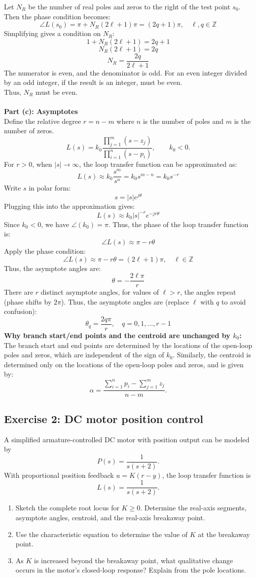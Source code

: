 \documentclass[11pt]{article}
\begin{document}
Let $N_R$ be the number of real poles and zeros to the right of the test point $s_0$. Then the phase condition becomes:
\[\angle L(s_0) = \pi + N_R(2\ell +1)\pi = (2q+1)\pi,\quad \ell,q\in\mathbb{Z}\]
Simplifying gives a condition on $N_R$:
\[1 + N_R(2\ell +1) = 2q+1\]
\[N_R(2\ell +1) = 2q\]
\[N_R = \frac{2 q}{2\ell +1} \]
The numerator is even, and the denominator is odd. For an even integer divided by an odd integer, if the result is an integer, must be even. $\boxed{\text{Thus, $N_R$ must be even.}}$\\\\
\textbf{Part (c): Asymptotes}\\
Define the relative degree $r = n - m$ where $n$ is the number of poles and $m$ is the number of zeros.
\[
L(s)=k_0\frac{\displaystyle\prod_{j=1}^{m}(s-z_j)}{\displaystyle\prod_{i=1}^{n}(s-p_i)}, \qquad k_0<0.
\]
For $r>0$, when $|s| \to \infty$, the loop transfer function can be approximated as:
\[L(s) \approx k_0 \frac{s^m}{s^n} = k_0 s^{m-n} = k_0 s^{-r}\]
Write $s$ in polar form:
\[s = |s| e^{j\theta}\]
Plugging this into the approximation gives:
\[L(s) \approx k_0 |s|^{-r} e^{-j r \theta}\]
Since $k_0<0$, we have $\angle(k_0) = \pi$. Thus, the phase of the loop transfer function is:
\[\angle L(s) \approx \pi - r \theta\]
Apply the phase condition:
\[\angle L(s) \approx \pi - r \theta = (2\ell+1)\pi,\quad \ell\in\mathbb{Z}\]
Thus, the asymptote angles are:
\[\theta = - \frac{2\ell\pi}{r}\]
There are $r$ distinct asymptote angles, for values of $\ell > r$, the angles repeat (phase shifts by $2\pi$). Thus, the asymptote angles are (replace $\ell$ with $q$ to avoid confusion):
\[\boxed{\theta_q  = \frac{2q\pi}{r}, \quad q = 0, 1, \ldots, r-1}\]
\textbf{Why branch start/end points and the centroid are unchanged by $k_0$:}\\
The branch start and end points are determined by the locations of the open-loop poles and zeros, which are independent of the sign of $k_0$. Similarly, the centroid is determined only on the locations of the open-loop poles and zeros, and is given by:
\[
\alpha=\frac{\sum_{i=1}^{n}p_i-\sum_{j=1}^{m}z_j}{n-m}.
\]


\subsection*{Exercise 2: DC motor position control}
A simplified armature-controlled DC motor with position output can be modeled by
\[
P(s)=\frac{1}{s(s+2)}.
\]
With proportional position feedback $u=K(r-y)$, the loop transfer function is
\[
L(s)=\frac{1}{s(s+2)}.
\]
\begin{enumerate}
    \item[(a)] Sketch the complete root locus for $K\geq 0$. Determine the real-axis segments, asymptote angles, centroid, and the real-axis breakaway point.
    \item[(b)] Use the characteristic equation to determine the value of $K$ at the breakaway point.
    \item[(c)] As $K$ is increased beyond the breakaway point, what qualitative change occurs in the motor's closed-loop response? Explain from the pole locations.
\end{enumerate}
\end{document}
